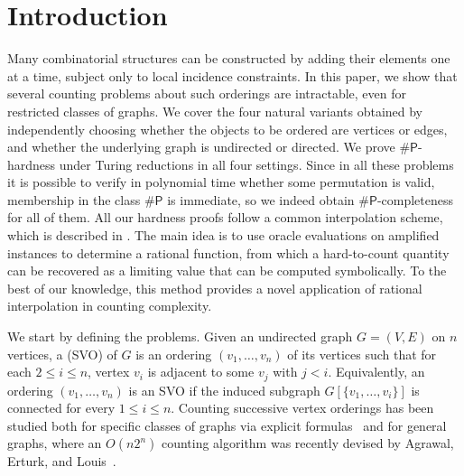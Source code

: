\documentclass[11pt]{amsart}
\begin{document}
\section{Introduction}


Many combinatorial structures can be constructed by adding their elements one at a time, subject only to local incidence constraints.
In this paper, we show that several counting problems about such orderings are intractable, even for restricted classes of graphs. We cover the four natural variants obtained by independently choosing whether the objects to be ordered are vertices or edges, and whether the underlying graph is undirected or directed. We prove $\#\mathsf{P}$-hardness under Turing reductions in all four settings. Since in all these problems it is possible to verify in polynomial time whether some permutation is valid, membership in the class $\#\mathsf{P}$ is immediate, so we indeed obtain $\#\mathsf{P}$-completeness for all of them.
All our hardness proofs follow a common interpolation scheme, which is described in . The main idea is to use oracle evaluations on amplified instances to determine a rational function, from which a hard-to-count quantity can be recovered as a limiting value that can be computed symbolically. To the best of our knowledge, this method provides a novel application of rational interpolation in counting complexity.

We start by defining the problems.
% 
    Given an undirected graph $G = (V, E)$ on $n$ vertices, a  (SVO) of $G$ is an ordering $(v_1, \dots, v_n)$ of its vertices such that for each $2 \leq i \leq n$, vertex $v_i$ is adjacent to some $v_j$ with $j < i$. 
Equivalently, an ordering $(v_1, \dots, v_n)$ is an SVO if the induced subgraph $G[\{v_1, \ldots, v_i\}]$ is connected for every $1 \leq i \leq n$. 
Counting successive vertex orderings has been studied both for specific classes of graphs via explicit formulas~\cite{FANG2023105776} and for general graphs, where an $O(n2^n)$ counting algorithm was recently devised by Agrawal, Erturk, and Louis~\cite{agrawal2026successivevertexorderingsconnected}.
\end{document}
